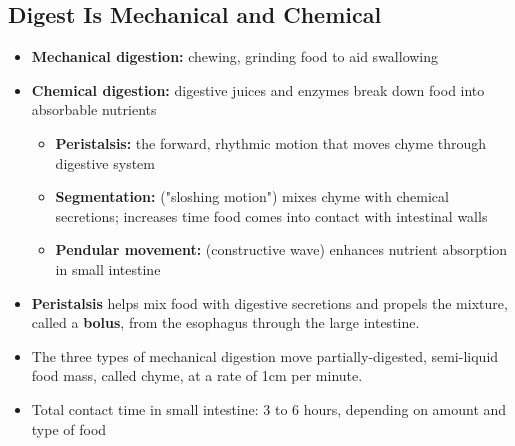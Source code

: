 \documentclass[12pt]{article}
\begin{document}
        \subsection{Digest Is Mechanical and Chemical}
            \begin{itemize}
                \item \textbf{Mechanical digestion:} chewing, grinding food to aid swallowing
                \item \textbf{Chemical digestion:} digestive juices and enzymes break down food into absorbable nutrients
                    \begin{itemize}
                        \item \textbf{Peristalsis:} the forward, rhythmic motion that moves chyme through digestive system
                        \item \textbf{Segmentation:} ("sloshing motion") mixes chyme with chemical secretions; increases time food comes into contact with intestinal walls
                        \item \textbf{Pendular movement:} (constructive wave) enhances nutrient absorption in small intestine
                    \end{itemize}
                \item \textbf{Peristalsis} helps mix food with digestive secretions and propels the mixture, called a \textbf{bolus}, from the esophagus through the large intestine.
                \item The three types of mechanical digestion move partially-digested, semi-liquid food mass, called chyme, at a rate of 1cm per minute.
                \item Total contact time in small intestine: 3 to 6 hours, depending on amount and type of food
            \end{itemize}
        
\end{document}
